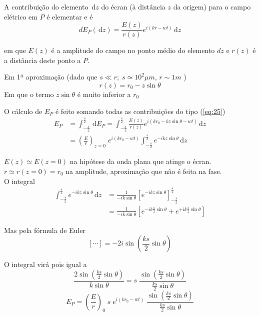 \documentclass[a4paper,12pt]{article}
\newcommand{\ud}{\,\mathrm{d}}
\begin{document}
A contribuição do elemento $\ud z$ do écran (à distância $z$ da origem) para o campo elétrico em $P$ é elementar e é 
\begin{equation}
	\label{eq:25} dE_P(\ud z) = \frac{E(z)}{r(z)} e^{i(kr- wt)} \ud z 
\end{equation}

em que $E(z)$ é a amplitude do campo no ponto médio do elemento $dz$ e $r(z)$ é a distância deste ponto a $P$.

Em 1ª aproximação (dado que $s \ll r;\; s \simeq 10^2 \mu m$, $r \sim 1m$ ) 
\begin{equation}
	\label{eq:26} r(z)= r_0 - z \sin \theta 
\end{equation}
Em que o termo $z \sin \theta $ é muito inferior a $r_0$

O cálculo de $E_P$ é feito somando todas as contribuições do tipo (\ref{eq:25}) 
\begin{align}
	E_P &= \int_{-\frac{s}{2}}^\frac{s}{2} \ud E_P = \int_{-\frac{s}{2}}^\frac{s}{2} \frac{E(z)}{r(z)} e^{i (k r_0 - k z \sin \theta -w t) } \ud z \nonumber\\
	&= ( \frac{E}{r} )_{z=0}\; e^{i (k r_0 -w t) } \int_{-\frac{s}{2}}^\frac{s}{2} e^{ -i k z \sin \theta } \ud z 
\end{align}

$E(z) \simeq E(z=0) $ na hipótese da onda plana que atinge o écran.\\
$r \simeq r(z=0) = r_0 $ na amplitude, aproximação que não é feita na fase.\\
O integral 
\begin{align} \label{eq:28}
	\int_{-\frac{s}{2}}^\frac{s}{2} e^{ -i k z \sin \theta } \ud z &= \frac{1}{-i k \sin \theta } \left[ e^{ -i k z \sin \theta } \right]_{-\frac{s}{2}}^\frac{s}{2}\nonumber \\
	&= \frac{1}{-i k  \sin \theta } \left[ e^{ -i k \frac{s}{2} \sin \theta } + e^{ +i k \frac{s}{2} \sin \theta } \right] 
\end{align}

Mas pela fórmula de Euler 
\begin{equation}
	\label{eq:29} \left[ \cdots \right] = -2 i \sin( \frac{k s}{2}\sin \theta) 
\end{equation}

O integral virá pois igual a 
\begin{equation*}
	\frac{2 \sin( \frac{k s}{2}\sin \theta)}{  k \sin \theta}= s \; \frac{ \sin( \frac{k s}{2}\sin \theta)}{ \frac{k s}{2}\sin \theta} 
\end{equation*}
\begin{equation}
	\label{eq:30} E_P = \left( \frac{E}{r} \right)_0 \; s \; e^{i(k r_0 -wt) } \;\frac{ \sin( \frac{k s}{2}\sin \theta)}{ \frac{k s}{2}\sin \theta} 
\end{equation}
\end{document}
